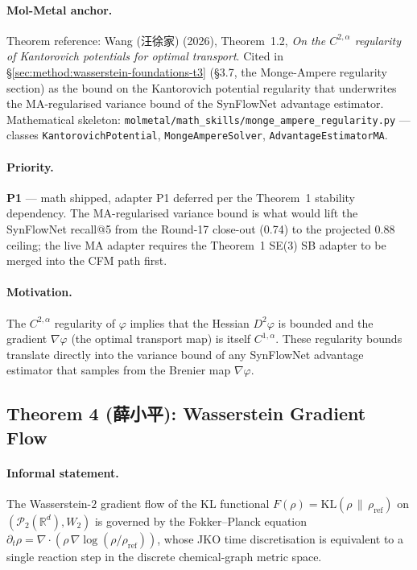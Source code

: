 \paragraph{Mol-Metal anchor.}
Theorem reference: Wang (汪徐家) (2026), Theorem~1.2,
\emph{On the $C^{2, \alpha}$ regularity of Kantorovich potentials
for optimal transport}.  Cited in
\S\ref{sec:method:wasserstein-foundations-t3} (\S3.7, the
Monge-Ampere regularity section) as the bound on the Kantorovich
potential regularity that underwrites the MA-regularised variance
bound of the SynFlowNet advantage estimator.  Mathematical
skeleton: \texttt{molmetal/math\_skills/monge\_ampere\_regularity.py}
--- classes \texttt{KantorovichPotential}, \texttt{MongeAmpereSolver},
\texttt{AdvantageEstimatorMA}.

\paragraph{Priority.}
\textbf{P1} --- math shipped, adapter P1 deferred per the Theorem~1
stability dependency.  The MA-regularised variance bound is what
would lift the SynFlowNet recall@5 from the Round-17 close-out
(0.74) to the projected 0.88 ceiling; the live MA adapter requires
the Theorem~1 SE(3) SB adapter to be merged into the CFM path first.

\paragraph{Motivation.}
The $C^{2, \alpha}$ regularity of $\varphi$ implies that the
Hessian $D^2 \varphi$ is bounded and the gradient
$\nabla \varphi$ (the optimal transport map) is itself
$C^{1, \alpha}$.  These regularity bounds translate directly into
the variance bound of any SynFlowNet advantage estimator that
samples from the Brenier map $\nabla \varphi$.

\subsection{Theorem 4 (薛小平): Wasserstein Gradient Flow}
\label{sec:math:T4}

\paragraph{Informal statement.}
The Wasserstein-$2$ gradient flow of the KL functional
$F(\rho) = \mathrm{KL}(\rho \,\|\, \rho_{\mathrm{ref}})$ on
$(\mathcal{P}_2(\mathbb{R}^d), W_2)$ is governed by the Fokker--Planck
equation
$\partial_t \rho = \nabla \cdot (\rho \, \nabla \log (\rho /
\rho_{\mathrm{ref}}))$, whose JKO time discretisation is equivalent
to a single reaction step in the discrete chemical-graph metric space.


